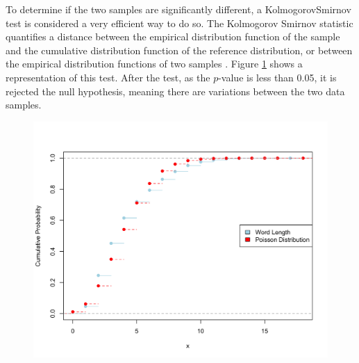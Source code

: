\documentclass[10pt,leter,openany]{article}
\begin{document}
	
	To determine if the two samples are significantly different, a Kolmogorov\textendash Smirnov test is considered a very efficient way to do so. The Kolmogorov \textendash Smirnov statistic quantifies a distance between the empirical distribution function of the sample and the cumulative distribution function of the reference distribution, or between the empirical distribution functions of two samples \citep{massey1951kolmogorov}.  Figure \ref{fig:KS} shows a representation of this test. After the test, as the $p$-value is less than 0.05, it is rejected the null hypothesis, meaning there are variations between the two data samples.
	
	
	\begin{figure}
		\begin{center}
			\includegraphics[scale=0.20]{extras/KS}
			\label{fig:KS}
		\end{center}
	\end{figure}
	
%
	
\clearpage

	
	
	
\end{document}
